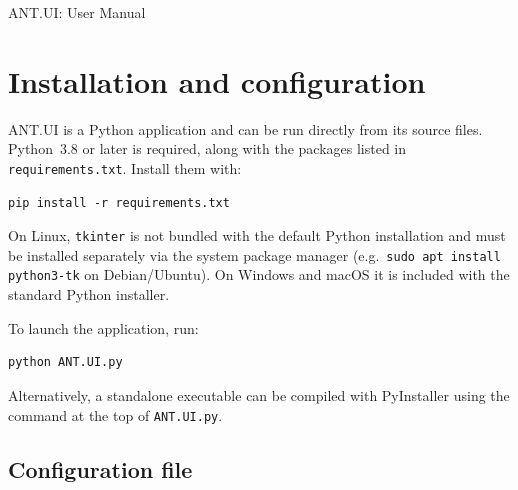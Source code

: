 \documentclass[12pt]{article}
\begin{document}

\vspace{10 mm}
\Huge
ANT.UI: User Manual\vspace{10 mm}
\normalsize

\begin{abstract}
ANT.UI is a graphical interface designed to streamline the construction of molecular junction inputs for ANT.Gaussian (ANT). The application allows users to build a complete junction geometry from scratch in real time, manipulating electrodes and molecules interactively in three dimensions, and to export ready-to-run input files for ANT and Gaussian with a single click. Advanced sequential-output tools further extend these capabilities, enabling automated electrode-pulling sequences, surface scans, and step-wise rotation studies. Together, these features substantially reduce the time required to set up transport calculations, both for experienced ANT users and for newcomers to theoretical molecular electronics.
\end{abstract}

\section{Installation and configuration}

ANT.UI is a Python application and can be run directly from its source files. Python~3.8 or later is required, along with the packages listed in \texttt{requirements.txt}. Install them with:

\begin{verbatim}
pip install -r requirements.txt
\end{verbatim}

On Linux, \texttt{tkinter} is not bundled with the default Python installation and must be installed separately via the system package manager (e.g.\ \texttt{sudo apt install python3-tk} on Debian/Ubuntu). On Windows and macOS it is included with the standard Python installer.

To launch the application, run:

\begin{verbatim}
python ANT.UI.py
\end{verbatim}

Alternatively, a standalone executable can be compiled with PyInstaller using the command at the top of \texttt{ANT.UI.py}.

\subsection*{Configuration file}
\end{document}
